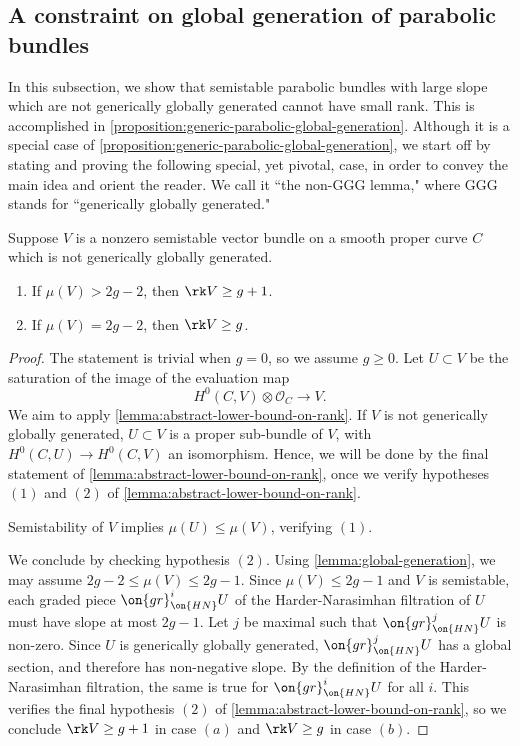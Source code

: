 \subsection{A constraint on global generation of parabolic bundles}

In this subsection, we show that semistable parabolic bundles with large slope which are not generically globally generated cannot have
small rank.
This is accomplished in
\autoref{proposition:generic-parabolic-global-generation}.
Although it is a special case of
\autoref{proposition:generic-parabolic-global-generation},
we start off by stating and proving the
following special, yet pivotal, case, in order to convey the main idea and orient the reader. We call it ``the non-GGG lemma," where GGG stands for ``generically globally generated."

\begin{proposition}
\notready
	\label{proposition:lower-bound-on-rank}
	Suppose $V$ is a nonzero semistable vector bundle on a smooth proper curve $C$
	which is not generically globally generated.
	\begin{enumerate}
		\item[(a)] If $\mu(V) > 2g - 2$, then $\rk V \geq g+1$.
		\item[(b)] If $\mu(V) = 2g-2$, then $\rk V \geq g$.
	\end{enumerate}
\end{proposition}
\begin{proof}
	The statement is trivial when $g =0$, so we assume $g \geq 0$.
	Let $U\subset V$ be the saturation of the image of the evaluation map $$H^0(C, V)\otimes \mathscr{O}_C\to V.$$
	We aim to apply
	\autoref{lemma:abstract-lower-bound-on-rank}.
	If $V$ is not generically globally generated, $U
	\subset V$ is a proper sub-bundle of $V$, with $H^0(C,U) \to H^0(C, V)$
	an isomorphism. Hence, we will be done by the final statement of
	\autoref{lemma:abstract-lower-bound-on-rank}, once we verify
	hypotheses $(1)$ and $(2)$ of
	\autoref{lemma:abstract-lower-bound-on-rank}.

	Semistability of $V$ implies $\mu(U) \leq \mu(V)$, verifying $(1)$.

	We conclude by checking hypothesis $(2)$.
	Using \autoref{lemma:global-generation},
	we may assume $2g-2 \leq \mu(V) \leq 2g - 1$.
	Since $\mu(V) \leq 2g-1$ and $V$ is semistable, each
	graded piece $\on{gr}^i_{\on{HN}}U$ of the Harder-Narasimhan filtration of $U$ must have slope
	at most $2g-1$. Let $j$ be maximal such that $\on{gr}^j_{\on{HN}}U$ is non-zero. Since $U$ is generically globally generated, $\on{gr}^j_{\on{HN}}U$ has a global section, and therefore has
	non-negative slope. By the definition of the Harder-Narasimhan filtration, the same is true for $\on{gr}^i_{\on{HN}}U$ for all $i$.
	This verifies the final hypothesis $(2)$ of
	\autoref{lemma:abstract-lower-bound-on-rank}, so we conclude $\rk V \geq
	g + 1$ in case $(a)$ and $\rk V\geq g$ in case $(b)$.
\end{proof}

